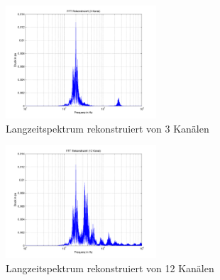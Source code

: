 \documentclass[conference]{IEEEtran}
\begin{document}
\begin{compactenum}[a)]
\begin{figure}[h!]
	\centering
	\includegraphics[width=0.5\textwidth]{img/fft_rec_3.png}
	\caption{Langzeitspektrum rekonstruiert von 3 Kanälen}
	\label{fig:fft-rec-3}
\end{figure}

\begin{figure}[h!]
	\centering
	\includegraphics[width=0.5\textwidth]{img/fft_rec_12.png}
	\caption{Langzeitspektrum rekonstruiert von 12 Kanälen}
	\label{fig:fft-rec-12}
\end{figure}
\end{compactenum}
\end{document}
